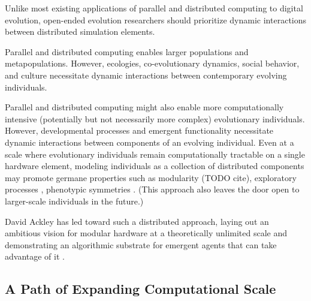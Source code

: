 

Unlike most existing applications of parallel and distributed computing to digital evolution, open-ended evolution researchers should prioritize dynamic interactions between distributed simulation elements.

Parallel and distributed computing enables larger populations and metapopulations.
However, ecologies, co-evolutionary dynamics, social behavior, and culture necessitate dynamic interactions between contemporary evolving individuals.

Parallel and distributed computing might also enable more computationally intensive (potentially but not necessarily more complex) evolutionary individuals.
However, developmental processes and emergent functionality necessitate dynamic interactions between components of an evolving individual. %
Even at a scale where evolutionary individuals remain computationally tractable on a single hardware element, modeling individuals as a collection of distributed components may promote germane properties such as modularity (TODO cite), exploratory processes \citep{gerhart2007theory}, phenotypic symmetries \citep{stanley2003taxonomy}. %
(This approach also leaves the door open to larger-scale individuals in the future.)

David Ackley has led toward such a distributed approach, laying out an ambitious vision for modular hardware at a theoretically unlimited scale \citep{ackley2011pursue} and demonstrating an algorithmic substrate for emergent agents that can take advantage of it \citep{ackley2018digital}.

\subsection{A Path of Expanding Computational Scale}

